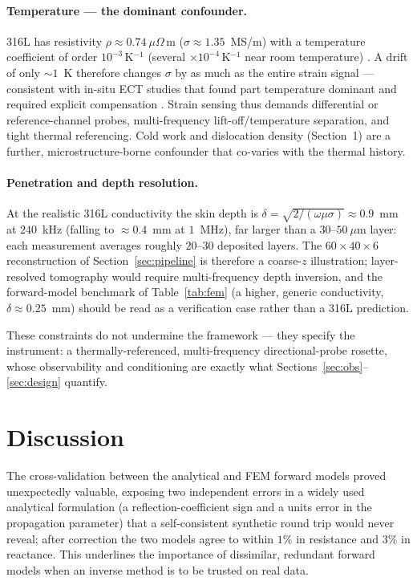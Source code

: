 \documentclass[11pt]{article}
\begin{document}
\paragraph{Temperature --- the dominant confounder.} 316L has resistivity
$\rho\approx0.74~\mu\Omega\,$m ($\sigma\approx1.35$~MS/m) with a temperature
coefficient of order $10^{-3}\,$K$^{-1}$ (several $\times10^{-4}\,$K$^{-1}$ near
room temperature) \cite{nist316l}. A drift of only ${\sim}1$~K therefore changes
$\sigma$ by as much as the entire strain signal --- consistent with in-situ ECT
studies that found part temperature dominant and required explicit compensation
\cite{spurek2024}. Strain sensing thus demands differential or reference-channel
probes, multi-frequency lift-off/temperature separation, and tight thermal
referencing. Cold work and dislocation density (Section~1) are a further,
microstructure-borne confounder that co-varies with the thermal history.

\paragraph{Penetration and depth resolution.} At the realistic 316L conductivity
the skin depth is $\delta=\sqrt{2/(\omega\mu\sigma)}\approx0.9$~mm at $240$~kHz
(falling to ${\approx}0.4$~mm at $1$~MHz), far larger than a $30$--$50~\mu$m
layer: each measurement averages roughly $20$--$30$ deposited layers. The
$60\times40\times6$ reconstruction of Section~\ref{sec:pipeline} is therefore a
coarse-$z$ illustration; layer-resolved tomography would require multi-frequency
depth inversion, and the forward-model benchmark of Table~\ref{tab:fem} (a higher,
generic conductivity, $\delta\approx0.25$~mm) should be read as a verification
case rather than a 316L prediction.

These constraints do not undermine the framework --- they specify the instrument:
a thermally-referenced, multi-frequency directional-probe rosette, whose
observability and conditioning are exactly what
Sections~\ref{sec:obs}--\ref{sec:design} quantify.

\section{Discussion}
The cross-validation between the analytical and FEM forward models proved
unexpectedly valuable, exposing two independent errors in a widely used
analytical formulation (a reflection-coefficient sign and a units error in the
propagation parameter) that a self-consistent synthetic round trip would never
reveal; after correction the two models agree to within $1\%$ in resistance and
$3\%$ in reactance. This underlines the importance of dissimilar, redundant
forward models when an inverse method is to be trusted on real data.
\end{document}
